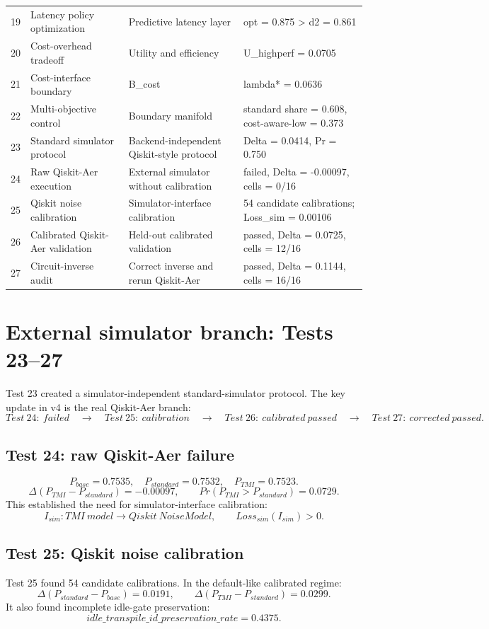 \documentclass[12pt,a4paper]{article}
\begin{document}
\begin{longtable}{p{0.9cm}p{4.0cm}p{5.0cm}p{5.4cm}}
19 & Latency policy optimization & Predictive latency layer & opt = 0.875 > d2 = 0.861 \\
20 & Cost-overhead tradeoff & Utility and efficiency & U\_highperf = 0.0705 \\
21 & Cost-interface boundary & B\_cost & lambda* = 0.0636 \\
22 & Multi-objective control & Boundary manifold & standard share = 0.608, cost-aware-low = 0.373 \\
23 & Standard simulator protocol & Backend-independent Qiskit-style protocol & Delta = 0.0414, Pr = 0.750 \\
24 & Raw Qiskit-Aer execution & External simulator without calibration & failed, Delta = -0.00097, cells = 0/16 \\
25 & Qiskit noise calibration & Simulator-interface calibration & 54 candidate calibrations; Loss\_sim = 0.00106 \\
26 & Calibrated Qiskit-Aer validation & Held-out calibrated validation & passed, Delta = 0.0725, cells = 12/16 \\
27 & Circuit-inverse audit & Correct inverse and rerun Qiskit-Aer & passed, Delta = 0.1144, cells = 16/16 \\
\bottomrule
\end{longtable}

\section{External simulator branch: Tests 23--27}

Test 23 created a simulator-independent standard-simulator protocol. The key update in v4 is the real Qiskit-Aer branch:
\[
Test\ 24:\ failed\quad\to\quad Test\ 25:\ calibration\quad\to\quad Test\ 26:\ calibrated\ passed\quad\to\quad Test\ 27:\ corrected\ passed.
\]

\subsection{Test 24: raw Qiskit-Aer failure}
\[
P_{base}=0.7535,\quad P_{standard}=0.7532,\quad P_{TMI}=0.7523.
\]
\[
\Delta(P_{TMI}-P_{standard})=-0.00097,\qquad Pr(P_{TMI}>P_{standard})=0.0729.
\]
This established the need for simulator-interface calibration:
\[
I_{sim}:TMI\ model\to Qiskit\ NoiseModel,\qquad Loss_{sim}(I_{sim})>0.
\]

\subsection{Test 25: Qiskit noise calibration}
Test 25 found 54 candidate calibrations. In the default-like calibrated regime:
\[
\Delta(P_{standard}-P_{base})=0.0191,\qquad \Delta(P_{TMI}-P_{standard})=0.0299.
\]
It also found incomplete idle-gate preservation:
\[
idle\_transpile\_id\_preservation\_rate=0.4375.
\]
\end{document}
